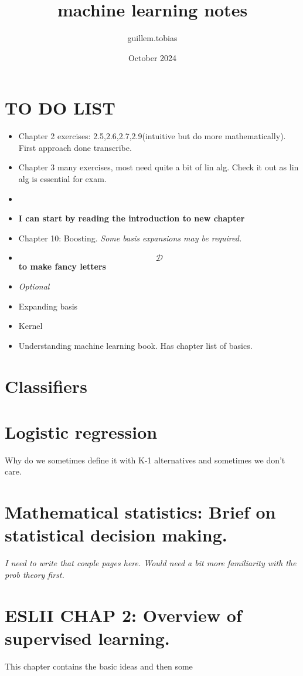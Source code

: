 \documentclass{article}
\begin{document}
\title{machine learning notes}
\author{guillem.tobias }
\date{October 2024}


\maketitle
\section{TO DO LIST}
\begin{itemize}
    \item Chapter 2 exercises: 2.5,2.6,2.7,2.9(intuitive but do more mathematically). First approach done transcribe.
    \item Chapter 3 many exercises, most need quite a bit of lin alg. Check it out as lin alg is essential for exam. 
    \item 
    \item \textbf{I can start by reading the introduction to new chapter}
    \item Chapter 10: Boosting. \textit{Some basis expansions may be required.}
    \item $$\mathcal{D}$$ \textbf{to make fancy letters}

    \item \textit{Optional}
    \item  Expanding basis 
    \item Kernel
    \item Understanding machine learning book. Has chapter list of basics.
\end{itemize}


\section{Classifiers}

\section{Logistic regression}
Why do we sometimes define it with K-1 alternatives and sometimes we don't care.

\section{Mathematical statistics: Brief on statistical decision making.}
\textit{I need to write that couple pages here. Would need a bit more familiarity with the prob theory first.}

\section{ESLII CHAP 2: Overview of supervised learning.}
This chapter contains the basic ideas and then some 
\end{document}
